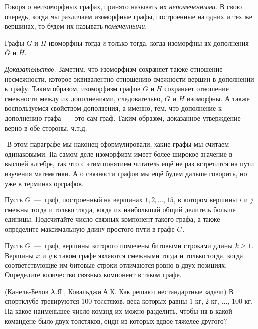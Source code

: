 	Говоря о неизоморфных графах, принято называть их \emph{непомеченными}. В свою очередь, когда мы различаем изоморфные графы, 
	построенные на одних и тех же вершинах, то будем их называть \emph{помеченными}.


\begin{statement}
	Графы $G$ и $H$ изоморфны тогда и только тогда, когда изоморфны их дополнения $\overline{G}$ и $\overline{H}$.
	
	\emph{Доказательство.} Заметим, что изоморфизм сохраняет также отношение несмежности, которое эквивалентно отношению 
	смежности вершин в дополнении к графу. Таким образом, изоморфизм графов $G$ и $H$ сохраняет отношение смежности между их дополнениями, 
	следовательно, $\overline{G}$ и $\overline{H}$ изоморфны. А также воспользуемся свойством дополнения, а именно, тем, 
	что дополнение к дополнению графа~---~это сам граф. Таким образом, доказанное утверждение верно в обе стороны. ч.т.д.
\end{statement}
$ $
\newline
	В этом параграфе мы наконец сформулировали, какие графы мы считаем одинаковыми. На самом деле изоморфизм имеет более 
	широкое значение в высшей алгебре, так что с этим понятием читатель ещё не раз встретится на пути изучения математики. 
	А о связности графов мы ещё будем дальше говорить, но уже в терминах орграфов.


\begin{exersize} 
	Пусть $G$~---~граф, построенный на вершинах $1, 2, \dots, 15$, в котором вершины $i$ и $j$ смежны тогда и только тогда, 
	когда их наибольший общий делитель больше единицы. Подсчитайте число связных компонент такого графа, а также определите 
	максимальную длину простого пути в графе $G$.
\end{exersize}

\begin{exersize} 
	Пусть $G$~---~граф, вершины которого помечены битовыми строками длины $k \geqslant 1$. 
	Вершины $x$ и $y$ в таком графе являются смежными тогда и только тогда, когда соответствующие
	им битовые строки отличаются ровно в двух позициях. Определите количество связных компонент 
	в таком графе.
\end{exersize}

\begin{exersize}(Канель-Белов А.Я., Ковальджи А.К. Как решают нестандартные задачи)
	В спортклубе тренируются $100$ толстяков, веса которых равны $1$ кг, $2$ кг, ..., $100$ кг. На какое наименьшее 
	число команд их можно разделить, чтобы ни в какой командене было двух толстяков, оидн из которых вдвое тяжелее другого?
\end{exersize}


